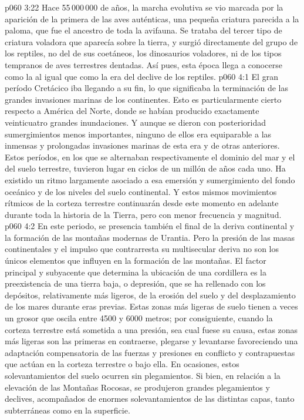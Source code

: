 \vs p060 3:22 \pc Hace 55\,000\,000 de años, la marcha evolutiva se vio marcada por la  aparición de la primera de las aves auténticas, una pequeña criatura parecida a la paloma, que fue el ancestro de toda la avifauna. Se trataba del tercer tipo de criatura voladora que aparecía sobre la tierra, y surgió directamente del grupo de los reptiles, no del de sus coetáneos, los dinosaurios voladores, ni de los tipos tempranos de aves terrestres dentadas. Así pues, esta época llega a conocerse como la  al igual que como la era del declive de los reptiles.
\vs p060 4:1 El gran período Cretácico iba llegando a su fin, lo que significaba la terminación de las grandes invasiones marinas de los continentes. Esto es particularmente cierto respecto a América del Norte, donde se habían producido exactamente veinticuatro grandes inundaciones. Y aunque se dieron con posterioridad sumergimientos menos importantes, ninguno de ellos era equiparable a las inmensas y prolongadas invasiones marinas de esta era y de otras anteriores. Estos períodos, en los que se alternaban respectivamente el dominio del mar y el del suelo terrestre, tuvieron lugar en ciclos de un millón de años cada uno. Ha existido un ritmo largamente asociado a esa emersión y sumergimiento del fondo oceánico y de los niveles del suelo continental. Y estos mismos movimientos rítmicos de la corteza terrestre continuarán desde este momento en adelante durante toda la historia de la Tierra, pero con menor frecuencia y magnitud.
\vs p060 4:2 En este periodo, se presencia también el final de la deriva continental y la formación de las montañas modernas de Urantia. Pero la presión de las masas continentales y el impulso que contrarresta su multisecular deriva no son los únicos elementos que influyen en la formación de las montañas. El factor principal y subyacente que determina la ubicación de una cordillera es la preexistencia de una tierra baja, o depresión, que se ha rellenado con los depósitos, relativamente más ligeros, de la erosión del suelo y del desplazamiento de los mares durante eras previas. Estas zonas más ligeras de suelo tienen a veces un grosor que oscila entre 4500 y 6000 metros; por consiguiente, cuando la corteza terrestre está sometida a una presión, sea cual fuese su causa, estas zonas más ligeras son las primeras en contraerse, plegarse y levantarse favoreciendo una adaptación compensatoria de las fuerzas y presiones en conflicto y contrapuestas que actúan en la corteza terrestre o bajo ella. En ocasiones, estos solevantamientos del suelo ocurren sin plegamientos. Si bien, en relación a la elevación de las Montañas Rocosas, se produjeron grandes plegamientos y declives, acompañados de enormes solevantamientos de las distintas capas, tanto subterráneas como en la superficie.
